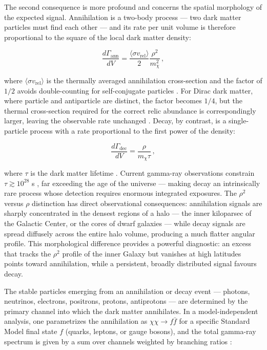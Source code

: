 The second consequence is more profound and concerns the spatial morphology of the expected signal.
Annihilation is a two-body process --- two dark matter particles must find each other --- and its rate per unit volume is therefore proportional to the square of the local dark matter density:

\begin{equation}
	\frac{d\Gamma_\text{ann}}{dV} = \frac{\langle \sigma v_\text{rel} \rangle}{2} \frac{\rho^2}{m_\chi^2} \,,
	\label{eq:ann_rate}
\end{equation}

where $\langle \sigma v_\text{rel} \rangle$ is the thermally averaged annihilation cross-section and the factor of $1/2$ avoids double-counting for self-conjugate particles \cite{Hooper:2024}.
For Dirac dark matter, where particle and antiparticle are distinct, the factor becomes $1/4$, but the thermal cross-section required for the correct relic abundance is correspondingly larger, leaving the observable rate unchanged \cite{Hooper:2024}.
Decay, by contrast, is a single-particle process with a rate proportional to the first power of the density:

\begin{equation}
	\frac{d\Gamma_\text{dec}}{dV} = \frac{\rho}{m_\chi \tau} \,,
	\label{eq:dec_rate}
\end{equation}

where $\tau$ is the dark matter lifetime \cite{Hooper:2024}.
Current gamma-ray observations constrain $\tau \gtrsim 10^{28}$ s \cite{Cohen:2016uyg,Blanco:2018esa}, far exceeding the age of the universe --- making decay an intrinsically rare process whose detection requires enormous integrated exposures.
The $\rho^2$ versus $\rho$ distinction has direct observational consequences: annihilation signals are sharply concentrated in the densest regions of a halo --- the inner kiloparsec of the Galactic Center, or the cores of dwarf galaxies --- while decay signals are spread diffusely across the entire halo volume, producing a much flatter angular profile.
This morphological difference provides a powerful diagnostic: an excess that tracks the $\rho^2$ profile of the inner Galaxy but vanishes at high latitudes points toward annihilation, while a persistent, broadly distributed signal favours decay.

The stable particles emerging from an annihilation or decay event --- photons, neutrinos, electrons, positrons, protons, antiprotons --- are determined by the primary channel into which the dark matter annihilates.
In a model-independent analysis, one parametrizes the annihilation as $\chi\chi \to f\bar{f}$ for a specific Standard Model final state $f$ (quarks, leptons, or gauge bosons), and the total gamma-ray spectrum is given by a sum over channels weighted by branching ratios \cite{Cirelli:2024ssz,Cirelli:2010xx,Arina:2025ner}:

